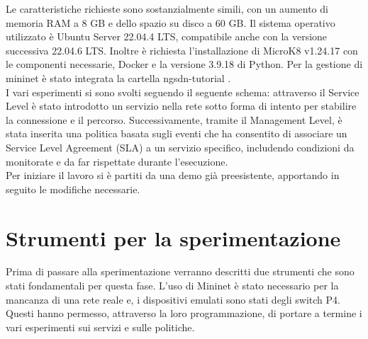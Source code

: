 Le caratteristiche richieste sono sostanzialmente simili, con un aumento di memoria RAM a 8 GB e dello spazio su disco a 60 GB.
Il sistema operativo utilizzato è Ubuntu Server 22.04.4 LTS, compatibile anche con la versione successiva 22.04.6 LTS. 
Inoltre è richiesta l'installazione di MicroK8 v1.24.17 con le componenti necessarie, Docker e la versione 3.9.18 di Python.
Per la gestione di mininet è stato integrata la cartella ngsdn-tutorial \cite{ngsdn}.
\\I vari esperimenti si sono svolti seguendo il seguente schema:
attraverso il Service Level è stato introdotto un servizio nella rete sotto forma di intento per stabilire la connessione e il percorso. 
Successivamente, tramite il Management Level, è stata inserita una politica basata sugli eventi che ha consentito di associare un Service Level Agreement (SLA) a un servizio specifico,
includendo condizioni da monitorate e da far rispettate durante l'esecuzione.
\\Per iniziare il lavoro si è partiti da una demo già preesistente, apportando in seguito le modifiche necessarie.
\section{Strumenti per la sperimentazione}
Prima di passare alla sperimentazione verranno descritti due strumenti che sono stati fondamentali per questa fase.
L'uso di Mininet è stato necessario per la mancanza di una rete reale e, i dispositivi emulati sono 
stati degli switch P4.
Questi hanno permesso, attraverso la loro programmazione, di portare a termine i vari esperimenti sui 
servizi e sulle politiche.
